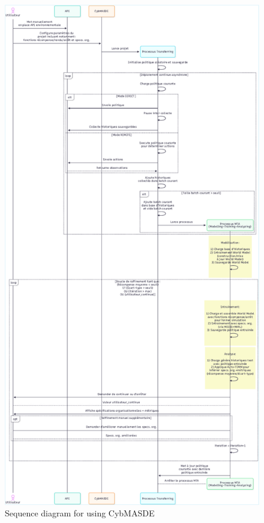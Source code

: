 \begin{figure}[H]
\includegraphics[trim={0cm 0cm 0cm 0cm},clip,height=\textheight]{figures/diagramme_sequence_CybMASDE.pdf}
\caption{Sequence diagram for using CybMASDE}
\label{fig:cybmasde_sequence}
\end {figure}

